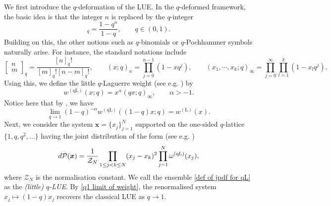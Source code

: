 \documentclass{amsart}
\def\bfs{\boldsymbol}
\newcommand{\qbinom}[2]{{\begin{bmatrix}#1\\#2\end{bmatrix}}_q}
\theoremstyle{plain}
\theoremstyle{remark}
\numberwithin{equation}{section}
\begin{document}
We first introduce the $q$-deformation of the LUE. In the $q$-deformed framework, the basic idea is that the integer $n$ is replaced by the $q$-integer 
\begin{equation}
[n]_q=\frac{1-q^n}{1-q}, \qquad q \in (0,1). 
\end{equation}
Building on this, the other notions such as $q$-binomials or $q$-Pochhammer symbols naturally arise. For instance, the standard notations include 
\begin{equation}
 \qbinom{n}{m}= \frac{[n]_q!}{ [m]_q![n-m]_q! } , \qquad   (x;q)_{n}=\prod_{j=0}^{n-1}(1-xq^{j}),\qquad (x_{1},\cdots,x_{k};q)_{\infty}=\prod_{j=0}^{\infty}  \prod_{l=1}^k (1-x_l q^j).  
\end{equation} 
Using this, we define the little $q$-Laguerre weight (see e.g. \cite[Eq.~(2.52)]{FLSY23}) by
\begin{equation} \label{def of qLUE weight}
    w^{(\mathrm{qL})}(x;q)=x^{\alpha}(qx;q)_{\infty},\qquad \alpha >-1.
\end{equation}
Notice here that by \cite[Eq.~(2.16)]{BF25a}, we have 
\begin{equation} \label{q1 limit of weight}
\lim_{q \to 1} (1-q)^{-\alpha} w^{(\mathrm{qL})}((1-q)x;q) =  w^{(\mathrm{L})}(x). 
\end{equation}
Next, we consider the system $\bfs{x}=\{x_j\}_{j=1}^N$ supported on the one-sided $q$-lattice $\{1,q,q^2,\dots \}$ having the joint distribution of the form (see e.g. \cite{Ol21,BFO24})
\begin{equation} \label{def of jpdf for qL}
 d\mathcal{P}(\bfs{x}) = \frac{1}{\mathcal{Z}_N}\prod_{1\le j<k \le N}(x_j-x_k)^2 \prod_{j=1}^N \omega^{\rm (qL)}(x_j), 
\end{equation}
where $\mathcal{Z}_N$ is the normalisation constant. We call the ensemble \eqref{def of jpdf for qL} as the \emph{(little) $q$-LUE}. By \eqref{q1 limit of weight}, the renormalised system $x_j \mapsto (1-q)x_j$ recovers the classical LUE as $ q \to 1$.
\end{document}

